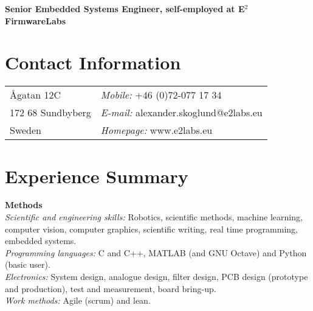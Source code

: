 \documentclass[a4paper,margin,line]{res} \usepackage{latexsym}
\begin{document}
\vspace*{.1in}

\begin{resume}
\hspace{-34mm}
{\bf \large Senior Embedded Systems Engineer, self-employed at E$^2$ FirmwareLabs}


\section{\sc Contact Information}
\vspace{.05in}
\begin{tabular}{@{}p{3in}p{3in}}
  Ågatan 12C & {\it Mobile:} +46 (0)72-077 17 34 \\
  172 68 Sundbyberg & {\it E-mail:} alexander.skoglund@e2labs.eu \\
  Sweden & {\it Homepage:} www.e2labs.eu \\
\end{tabular}



\section{\sc Experience Summary}

{\bf Methods}\\ {\em Scientific and engineering skills:} Robotics,
scientific methods, machine learning, computer vision, computer
graphics, scientific writing, real time programming, embedded
systems.\\ {\em Programming languages:} C and C++, {M}ATLAB (and GNU
Octave) and Python (basic user). \\ {\em Electronics:} System design,
analogue design, filter design, PCB design (prototype and production),
test and measurement, board bring-up.\\ {\em Work methods:} Agile
(scrum) and lean.


\end{resume}
\end{document}
